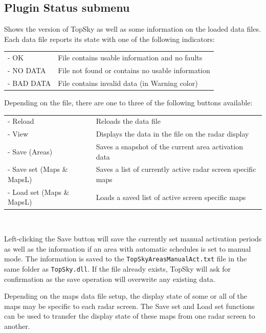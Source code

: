\documentclass[a4paper,oneside,11pt]{memoir}
\newcommand{\colorref}[1]{\colorbox{Flight Highlight}{\color{#1}#1}}
\begin{document}
\subsection*{Plugin Status submenu}
\label{menu:status}
Shows the version of TopSky as well as some information on the loaded data files. Each data file reports its state with one of the following indicators:

\bigskip

\begin{tabular}{l l}
- OK        & File contains usable information and no faults\\
- NO DATA   & File not found or contains no usable information\\
- BAD DATA  & File contains invalid data (in \colorref{Warning} color)\\
\end{tabular}

\bigskip

Depending on the file, there are one to three of the following buttons available:

\bigskip

\begin{tabular}{l l}
- Reload                    & Reloads the data file\\
- View                    & Displays the data in the file on the radar display\\
- Save (Areas)            & Saves a snapshot of the current area activation data\\
- Save set (Maps \& MapsL) & Saves a list of currently active radar screen specific maps\\
- Load set (Maps \& MapsL) & Loads a saved list of active screen specific maps\\
\end{tabular}\\ 

\bigskip

Left-clicking the Save button will save the currently set manual activation periods as well as the information if an area with automatic schedules is set to manual mode. The information is saved to the \texttt{TopSkyAreasManualAct.txt} file in the same folder as \texttt{TopSky.dll}. If the file already exists, TopSky will ask for confirmation as the save operation will overwrite any existing data. 

\bigskip

Depending on the maps data file setup, the display state of some or all of the maps may be specific to each radar screen. The Save set and Load set functions can be used to transfer the display state of these maps from one radar screen to another.
\end{document}
